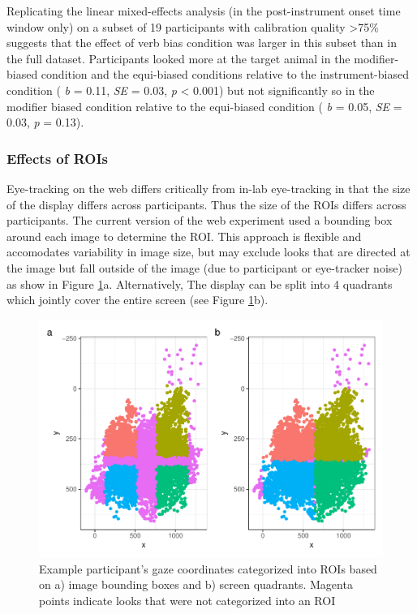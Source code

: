 \documentclass[
  man,floatsintext]{apa6}
\begin{document}
Replicating the linear mixed-effects analysis (in the post-instrument onset time window only) on a subset of 19 participants with calibration quality \textgreater75\% suggests that the effect of verb bias condition was larger in this subset than in the full dataset.
Participants looked more at the target animal in the modifier-biased condition and the equi-biased conditions relative to the instrument-biased condition ( \emph{b} = 0.11, \emph{SE} = 0.03, \emph{p} \textless{} 0.001) but not significantly so in the modifier biased condition relative to the equi-biased condition ( \emph{b} = 0.05, \emph{SE} = 0.03, \emph{p} = 0.13).

\hypertarget{effects-of-rois-1}{%
\subsubsection{Effects of ROIs}\label{effects-of-rois-1}}

Eye-tracking on the web differs critically from in-lab eye-tracking in that the size of the display differs across participants. Thus the size of the ROIs differs across participants. The current version of the web experiment used a bounding box around each image to determine the ROI.
This approach is flexible and accomodates variability in image size, but may exclude looks that are directed at the image but fall outside of the image (due to participant or eye-tracker noise) as show in Figure \ref{fig:E4-example-subj-looks-ROI}a. Alternatively, The display can be split into 4 quadrants which jointly cover the entire screen (see Figure \ref{fig:E4-example-subj-looks-ROI}b).

\begin{figure}
\centering
\includegraphics{manuscript_files/figure-latex/E4-example-subj-looks-ROI-1.pdf}
\caption{\label{fig:E4-example-subj-looks-ROI}Example participant's gaze coordinates categorized into ROIs based on a) image bounding boxes and b) screen quadrants. Magenta points indicate looks that were not categorized into an ROI}
\end{figure}
\end{document}
